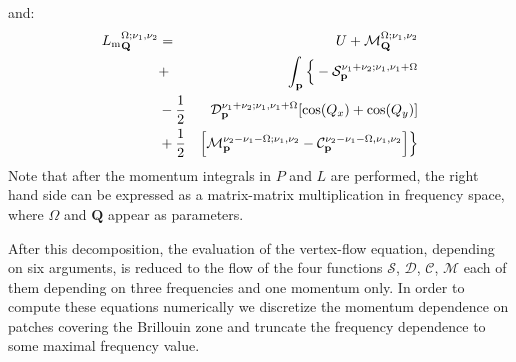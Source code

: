 and: 
\begin{eqnarray} 
\nonumber
{L_\mathrm{m}}^{\Omega;\nu_1,\nu_2}_{\mathbf{Q}}&=&U+\mathcal{M}_{\mathbf{Q}}^{\Omega;\nu_1,\nu_2} \\
\nonumber 
&+& \int_{\mathbf{p}} \Big \{- \mathcal{S}_{\mathbf{p}}^{\nu_1+\nu_2;\nu_1,\nu_1+\Omega}  
 \\
 \nonumber 
&-\frac{1}{2}& \mathcal{D}_{\mathbf{p}}^{\nu_1+\nu_2;\nu_1,\nu_1+\Omega}
[\cos(Q_x)+\cos(Q_y)]
 \\ 
&+\frac{1}{2}& \Big[  \mathcal{M}_{\mathbf{p}}^{\nu_2-\nu_1-\Omega; \nu_1,\nu_2} 
- \mathcal{C}_{\mathbf{p}}^{\nu_2-\nu_1-\Omega,\nu_1,\nu_2} \Big] 
\Big \} 
\end{eqnarray}	 
Note that after the momentum integrals in $P$ and $L$ are performed, the right hand side can be expressed as a matrix-matrix multiplication in frequency space, where $\Omega$ and $\mathbf{Q}$ appear as parameters.

After this decomposition, the evaluation of the vertex-flow equation, depending on six arguments, is reduced to the flow of the four functions $\mathcal{S}$, $\mathcal{D}$, $\mathcal{C}$, $\mathcal{M}$ 
each of them depending on three frequencies and one momentum only. In order to compute these equations numerically we discretize the momentum 
dependence on patches covering the Brillouin zone and truncate the frequency dependence to some maximal frequency value.

